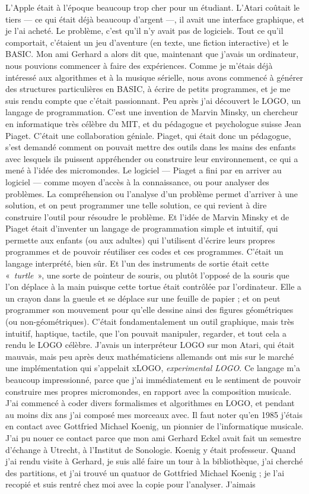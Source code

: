 \documentclass[a4paper,12pt]{article}
\newcommand{\guill}[1]{«~#1~»}
\begin{document}
L'Apple était à l'époque beaucoup trop cher pour un étudiant. L'Atari coûtait le tiers --- ce qui était déjà beaucoup d'argent ---, il avait une interface graphique, et je l'ai acheté. Le problème, c'est qu'il n'y avait pas de logiciels. Tout ce qu'il comportait, c'étaient un jeu d'aventure (en texte, une fiction interactive) et le BASIC. Mon ami Gerhard a alors dit que, maintenant que j'avais un ordinateur, nous pouvions commencer à faire des expériences. Comme je m'étais déjà intéressé aux algorithmes et à la musique sérielle, nous avons commencé à générer des structures particulières en BASIC, à écrire de petits programmes, et je me suis rendu compte que c'était passionnant. Peu après j'ai découvert le LOGO, un langage de programmation. C'est une invention de Marvin Minsky, un chercheur en informatique très célèbre du MIT, et du pédagogue et psychologue suisse Jean Piaget. C'était une collaboration géniale. Piaget, qui était donc un pédagogue, s'est demandé comment on pouvait mettre des outils dans les mains des enfants avec lesquels ils puissent appréhender ou construire leur environnement, ce qui a mené à l'idée des micromondes. Le logiciel --- Piaget a fini par en arriver au logiciel --- comme moyen d'accès à la connaissance, ou pour analyser des problèmes. La compréhension ou l'analyse d'un problème permet d'arriver à une solution, et on peut programmer une telle solution, ce qui revient à dire construire l'outil pour résoudre le problème. Et l'idée de Marvin Minsky et de Piaget était d'inventer un langage de programmation simple et intuitif, qui permette aux enfants (ou aux adultes) qui l'utilisent d'écrire leurs propres programmes et de pouvoir réutiliser ces codes et ces programmes. C'était un langage interprété, bien sûr. Et l'un des instruments de sortie était cette \guill{\emph{turtle}}, une sorte de pointeur de souris, ou plutôt l'opposé de la souris que l'on déplace à la main puisque cette tortue était contrôlée par l'ordinateur. Elle a un crayon dans la gueule et se déplace sur une feuille de papier ; et on peut programmer son mouvement pour qu'elle dessine ainsi des figures géométriques (ou non-géométriques). C'était fondamentalement un outil graphique, mais très intuitif, haptique, tactile, que l'on pouvait manipuler, regarder, et tout cela a rendu le LOGO célèbre. J'avais un interpréteur LOGO sur mon Atari, qui était mauvais, mais peu après deux mathématiciens allemands ont mis sur le marché une implémentation qui s'appelait xLOGO, \emph{experimental LOGO}. Ce langage m'a beaucoup impressionné, parce que j'ai immédiatement eu le sentiment de pouvoir construire mes propres micromondes, en rapport avec la composition musicale. J'ai commencé à coder divers formalismes et algorithmes en LOGO, et pendant au moins dix ans j'ai composé mes morceaux avec. Il faut noter qu'en 1985 j'étais en contact avec Gottfried Michael Koenig, un pionnier de l'informatique musicale. J'ai pu nouer ce contact parce que mon ami Gerhard Eckel avait fait un semestre d'échange à Utrecht, à l'Institut de Sonologie. Koenig y était professeur. Quand j'ai rendu visite à Gerhard, je suis allé faire un tour à la bibliothèque, j'ai cherché des partitions, et j'ai trouvé un quatuor de Gottfried Michael Koenig ; je l'ai recopié et suis rentré chez moi avec la copie pour l'analyser. J'aimais 
\end{document}
